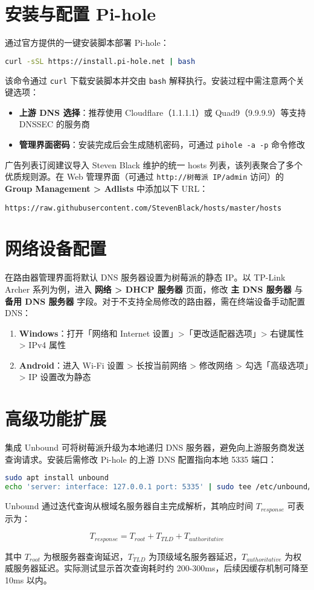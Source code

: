 \chapter{安装与配置 Pi-hole}
通过官方提供的一键安装脚本部署 Pi-hole：\par
\begin{lstlisting}[language=bash]
curl -sSL https://install.pi-hole.net | bash
\end{lstlisting}
该命令通过 \verb!curl! 下载安装脚本并交由 \verb!bash! 解释执行。安装过程中需注意两个关键选项：\par
\begin{itemize}
\item \textbf{上游 DNS 选择}：推荐使用 Cloudflare（1.1.1.1）或 Quad9（9.9.9.9）等支持 DNSSEC 的服务商
\item \textbf{管理界面密码}：安装完成后会生成随机密码，可通过 \verb!pihole -a -p! 命令修改
\end{itemize}
广告列表订阅建议导入 Steven Black 维护的统一 hosts 列表，该列表聚合了多个优质规则源。在 Web 管理界面（可通过 \verb!http://树莓派 IP/admin! 访问）的 \textbf{Group Management > Adlists} 中添加以下 URL：\par
\begin{lstlisting}
https://raw.githubusercontent.com/StevenBlack/hosts/master/hosts
\end{lstlisting}
\chapter{网络设备配置}
在路由器管理界面将默认 DNS 服务器设置为树莓派的静态 IP。以 TP-Link Archer 系列为例，进入 \textbf{网络 > DHCP 服务器} 页面，修改 \textbf{主 DNS 服务器} 与 \textbf{备用 DNS 服务器} 字段。对于不支持全局修改的路由器，需在终端设备手动配置 DNS：\par
\begin{enumerate}
\item \textbf{Windows}：打开「网络和 Internet 设置」>「更改适配器选项」> 右键属性 > IPv4 属性
\item \textbf{Android}：进入 Wi-Fi 设置 > 长按当前网络 > 修改网络 > 勾选「高级选项」> IP 设置改为静态
\end{enumerate}
\chapter{高级功能扩展}
集成 Unbound 可将树莓派升级为本地递归 DNS 服务器，避免向上游服务商发送查询请求。安装后需修改 Pi-hole 的上游 DNS 配置指向本地 5335 端口：\par
\begin{lstlisting}[language=bash]
sudo apt install unbound
echo 'server: interface: 127.0.0.1 port: 5335' | sudo tee /etc/unbound/unbound.conf.d/pi-hole.conf
\end{lstlisting}
Unbound 通过迭代查询从根域名服务器自主完成解析，其响应时间 $T_{response}$ 可表示为：\par
$$ T_{response} = T_{root} + T_{TLD} + T_{authoritative} $$\par
其中 $T_{root}$ 为根服务器查询延迟，$T_{TLD}$ 为顶级域名服务器延迟，$T_{authoritative}$ 为权威服务器延迟。实际测试显示首次查询耗时约 200-300ms，后续因缓存机制可降至 10ms 以内。\par
